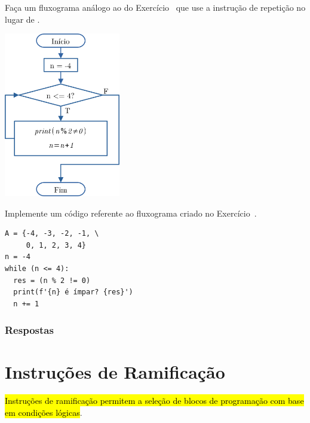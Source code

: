 \begin{exer}\label{cap_progest_sec_est:exer:while}
  Faça um fluxograma análogo ao do Exercício~ que use a instrução de repetição {\PYTHONwhile} no lugar de {\PYTHONfor}.
\end{exer}
\begin{resp}

  \includegraphics[width=2in]{cap_progest/dados/fig_exer_while/fig.png}

\end{resp}

\begin{exer}
  Implemente um código referente ao fluxograma criado no Exercício~.
\end{exer}
\begin{resp}

\begin{lstlisting}
A = {-4, -3, -2, -1, \
     0, 1, 2, 3, 4}
n = -4
while (n <= 4):
  res = (n % 2 != 0)
  print(f'{n} é ímpar? {res}')
  n += 1
\end{lstlisting}

\end{resp}

\ifisbook
\subsubsection{Respostas}
\shipoutAnswer
\fi


\section{Instruções de Ramificação}\label{cap_progest_sec_ramifica}

\hl{Instruções de ramificação permitem a seleção de blocos de programação com base em condições lógicas}.

